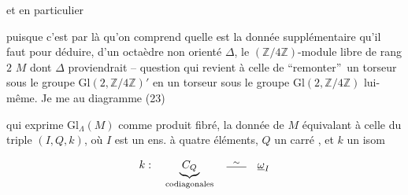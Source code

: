 et en particulier


puisque c'est par là qu'on comprend quelle est la donnée supplémentaire qu'il faut pour déduire, d'un octaèdre non orienté $\Delta$, le $(\mathbb Z/4\mathbb Z)$-module libre de rang $2$ $M$ dont $\Delta$ proviendrait -- question qui revient à celle de \textquotedblleft remonter\textquotedblright\ un torseur sous le groupe $\mathrm{Gl}(2,\mathbb Z/4\mathbb Z)'$ en un torseur sous le groupe $\mathrm{Gl}(2,\mathbb Z/4\mathbb Z)$ lui-même.
Je me  au diagramme (23)


qui exprime $\mathrm{Gl}_\Lambda(M)$ comme produit fibré, la donnée de $M$ équivalant à celle du triple $(I,Q,k)$, où $I$ est un ens. à quatre éléments, $Q$ un carré , et $k$ un isom

\[
k:\quad\underbrace{C_Q}_{\text{codiagonales}}\quad\overset{\sim}{\rule[.2ex]{1.8em}{.4pt}}\quad\underline\omega_I
\]


